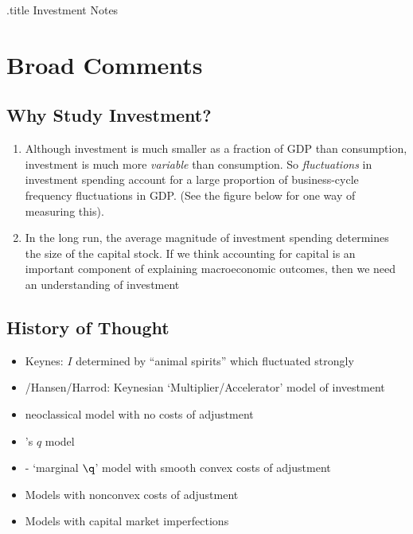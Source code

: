 \documentclass{handout}
\begin{document}
\handoutHeader

\begin{verbatimwrite}{\jobname.title}
Investment Notes
\end{verbatimwrite}

\handoutNameMake

\section{Broad Comments}

\subsection{Why Study Investment?}

\begin{enumerate}
\item Although investment is much smaller as a fraction of GDP than consumption, investment is 
much more {\it variable} than consumption.  So {\it fluctuations} in investment spending account
for  a large proportion of business-cycle frequency fluctuations in GDP.  (See the figure below for one way of measuring this).  



\item In the long run, the average magnitude of investment spending determines the size of the
capital stock.  If we think accounting for capital is an important component of explaining 
macroeconomic outcomes, then we need an understanding of investment
\end{enumerate}

\subsection{History of Thought}

\begin{itemize}
\item Keynes: $I$ determined by ``animal spirits'' which fluctuated strongly
\item \cite{samuelsonI}/Hansen/Harrod: Keynesian `Multiplier/Accelerator' model of investment
\item \cite{hall&jorgenson:i} neoclassical model with no costs of adjustment 
\item \cite{tobinsQ}'s $q$ model
\item \cite{abel:q}-\cite{hayashi:q} `marginal $\q$' model with smooth convex costs of adjustment
\item Models with nonconvex costs of adjustment
\item Models with capital market imperfections
\end{itemize}
\end{document}
